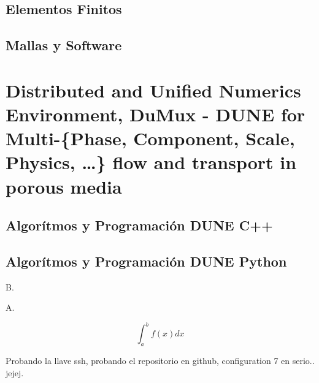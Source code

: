 \documentclass[10pt,
	a4paper,
	spanish,
	titlepage=firstiscover,
	titlepage=true,
	BCOR=2cm,
	DIV=12
]{scrbook}
\begin{document}
\begin{refsection}
	\chapter{Elementos Finitos}
	\chapter{Mallas y Software}
	\part{Distributed and Unified Numerics Environment, DuMux - DUNE for Multi-\{Phase, Component, Scale, Physics, \dots\} flow and transport in porous media} %
	\chapter{Algorítmos y Programación DUNE C++} %
	
	\chapter{Algorítmos y Programación DUNE Python}

	B.\cite{Reilly}

	\printbibliography[
	title={Referencias},
	heading=bibintoc]
	\nocite{*}
	\printbibliography[
	title={Bibliografía},
	heading=none,keyword=paper]
\end{refsection}

A.

$$\int_a^b f(x)dx$$

Probando la llave ssh, probando el repositorio en github, configuration 7 en serio.. jejej.

\printindex
\end{document}
